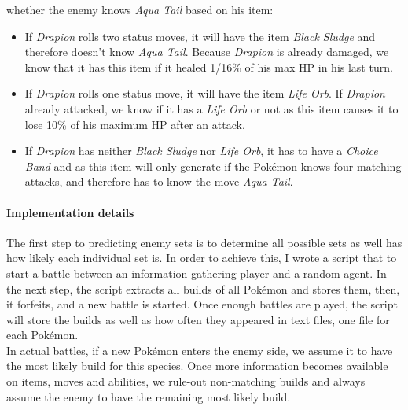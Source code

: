 whether the enemy knows \textit{Aqua Tail} based on his item:
\begin{itemize}
	\item If \textit{Drapion} rolls two status moves, it will have the item \textit{Black Sludge} and therefore 
	doesn't know \textit{Aqua Tail}. Because \textit{Drapion} is already damaged, we know that it has this item
	if it healed 1/16\% of his max \ac{HP} in his last turn. 
	\item If \textit{Drapion} rolls one status move, it will have the item \textit{Life Orb}. If \textit{Drapion}
	already attacked, we know if it has a \textit{Life Orb} or not as this item causes it to lose 10\% of his
	maximum \ac{HP} after an attack.
	\item If \textit{Drapion} has neither \textit{Black Sludge} nor \textit{Life Orb}, it has to have a
	\textit{Choice Band} and as this item will only generate if the Pokémon knows four matching attacks,
	and therefore has to know the move \textit{Aqua Tail}.
\end{itemize}
\paragraph{Implementation details}
The first step to predicting enemy sets is to determine all possible sets as well has how likely each individual set
is. In order to achieve this, I wrote a script that to start a battle between an information gathering player and 
a random agent. In the next step, the script extracts all builds of all Pokémon and stores them, then, it forfeits, 
and a new battle is started. Once enough battles are played, the script will store the builds as well as how often
they appeared in text files, one file for each Pokémon. \\
In actual battles, if a new Pokémon enters the enemy side, we assume it to have the most likely build for this species. 
Once more information becomes available on items, moves and abilities, we rule-out non-matching builds and always
assume the enemy to have the remaining most likely build.

